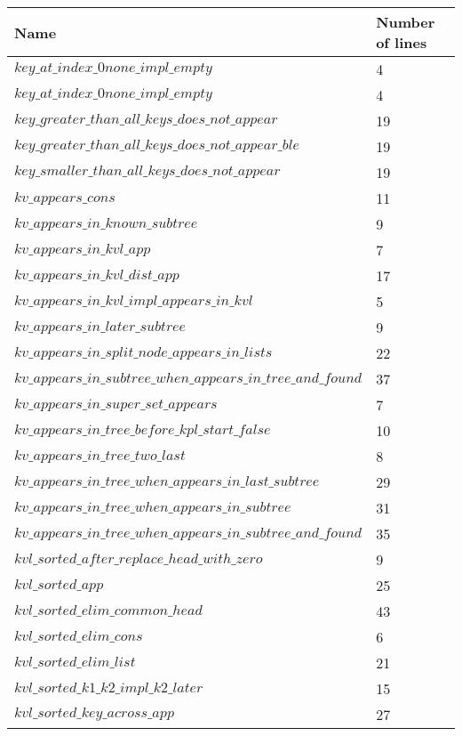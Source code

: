 \begin{tabular}{| l | l |}
\hline
Name & Number of lines \\ \hline
$key\_at\_index\_0none\_impl\_empty$ & 4 \\ \hline
$key\_at\_index\_0none\_impl\_empty$ & 4 \\ \hline
$key\_greater\_than\_all\_keys\_does\_not\_appear$ & 19 \\ \hline
$key\_greater\_than\_all\_keys\_does\_not\_appear\_ble$ & 19 \\ \hline
$key\_smaller\_than\_all\_keys\_does\_not\_appear$ & 19 \\ \hline
$kv\_appears\_cons$ & 11 \\ \hline
$kv\_appears\_in\_known\_subtree$ & 9 \\ \hline
$kv\_appears\_in\_kvl\_app$ & 7 \\ \hline
$kv\_appears\_in\_kvl\_dist\_app$ & 17 \\ \hline
$kv\_appears\_in\_kvl\_impl\_appears\_in\_kvl$ & 5 \\ \hline
$kv\_appears\_in\_later\_subtree$ & 9 \\ \hline
$kv\_appears\_in\_split\_node\_appears\_in\_lists$ & 22 \\ \hline
$kv\_appears\_in\_subtree\_when\_appears\_in\_tree\_and\_found$ & 37 \\ \hline
$kv\_appears\_in\_super\_set\_appears$ & 7 \\ \hline
$kv\_appears\_in\_tree\_before\_kpl\_start\_false$ & 10 \\ \hline
$kv\_appears\_in\_tree\_two\_last$ & 8 \\ \hline
$kv\_appears\_in\_tree\_when\_appears\_in\_last\_subtree$ & 29 \\ \hline
$kv\_appears\_in\_tree\_when\_appears\_in\_subtree$ & 31 \\ \hline
$kv\_appears\_in\_tree\_when\_appears\_in\_subtree\_and\_found$ & 35 \\ \hline
$kvl\_sorted\_after\_replace\_head\_with\_zero$ & 9 \\ \hline
$kvl\_sorted\_app$ & 25 \\ \hline
$kvl\_sorted\_elim\_common\_head$ & 43 \\ \hline
$kvl\_sorted\_elim\_cons$ & 6 \\ \hline
$kvl\_sorted\_elim\_list$ & 21 \\ \hline
$kvl\_sorted\_k1\_k2\_impl\_k2\_later$ & 15 \\ \hline
$kvl\_sorted\_key\_across\_app$ & 27 \\ \hline

\end{tabular}
